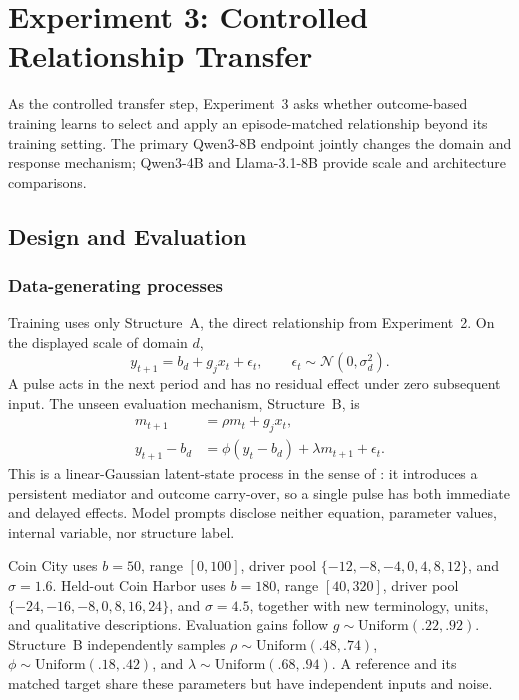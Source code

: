 
\section{Experiment 3: Controlled Relationship Transfer}
\label{app:exp3}

As the controlled transfer step, Experiment~3 asks whether outcome-based training
learns to select and apply an episode-matched relationship beyond its training
setting. The primary Qwen3-8B endpoint jointly changes the domain and response
mechanism; Qwen3-4B and Llama-3.1-8B provide scale and architecture comparisons.

\subsection{Design and Evaluation}
\label{app:exp3-coin-structural}

\subsubsection{Data-generating processes}

Training uses only Structure~A, the direct relationship from Experiment~2. On
the displayed scale of domain $d$,
\begin{equation}
  y_{t+1}=b_d+g_jx_t+\epsilon_t,\qquad
  \epsilon_t\sim\mathcal N(0,\sigma_d^2).
  \label{eq:exp3-coin-a}
\end{equation}
A pulse acts in the next period and has no residual effect under zero subsequent
input. The unseen evaluation mechanism, Structure~B, is
\begin{align}
  m_{t+1}&=\rho m_t+g_jx_t,\\
  y_{t+1}-b_d&=\phi(y_t-b_d)+\lambda m_{t+1}+\epsilon_t.
  \label{eq:exp3-coin-b}
\end{align}
This is a linear-Gaussian latent-state process in the sense of
\citet{kalman1960new}: it introduces a persistent mediator and outcome carry-over,
so a single pulse has both immediate and delayed effects. Model prompts disclose neither equation,
parameter values, internal variable, nor structure label.

Coin City uses $b=50$, range $[0,100]$, driver pool
$\{-12,-8,-4,0,4,8,12\}$, and $\sigma=1.6$. Held-out Coin Harbor uses
$b=180$, range $[40,320]$, driver pool
$\{-24,-16,-8,0,8,16,24\}$, and $\sigma=4.5$, together with new terminology,
units, and qualitative descriptions. Evaluation gains follow
$g\sim\mathrm{Uniform}(.22,.92)$. Structure~B independently samples
$\rho\sim\mathrm{Uniform}(.48,.74)$,
$\phi\sim\mathrm{Uniform}(.18,.42)$, and
$\lambda\sim\mathrm{Uniform}(.68,.94)$. A reference and its matched target share
these parameters but have independent inputs and noise.


